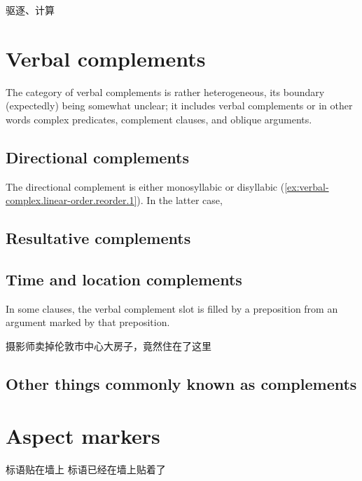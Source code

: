 \documentclass[UTF8, a4paper, oneside, scheme=plain, 12pt]{ctexrep}
\begin{document}
驱逐、计算


\section{Verbal complements}\label{sec:verbal-complex.complement}

The category of verbal complements is rather heterogeneous,
its boundary (expectedly) being somewhat unclear;
it includes verbal complements or in other words complex predicates, 
complement clauses, 
and oblique arguments. 

\subsection{Directional complements}\label{sec:verbal-complex.directional}

The directional complement is either monosyllabic or disyllabic
(\ref{ex:verbal-complex.linear-order.reorder.1}).
In the latter case, 

\subsection{Resultative complements}\label{sec:verbal-complex.resultative}

\subsection{Time and location complements}\label{sec:verbal-complex.prepositional}

In some clauses, the verbal complement slot is filled by a preposition
from an argument marked by that preposition.

\begin{exe}
    \ex 摄影师卖掉伦敦市中心大房子，竟然住在了这里
\end{exe}

\subsection{Other things commonly known as complements}

\section{Aspect markers}

\begin{exe}
    \ex 标语贴在墙上 
    \ex 标语已经在墙上贴着了
\end{exe}
 
\end{document}
